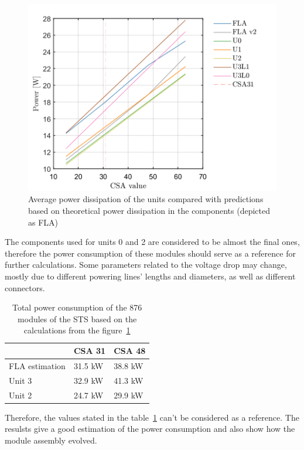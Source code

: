 \begin{figure}[h!]
\centering
\includegraphics[width=0.65\columnwidth]{Chapter6/DCS/images/theor.png}
\caption{Average power dissipation of the units compared with predictions based on theoretical power dissipation in the components (depicted as FLA)} 
\label{fig_theor}
\end{figure}
The components used for units 0 and 2 are considered to be almost the final ones, therefore the power consumption of these modules should serve as a reference for further calculations. Some parameters related to the voltage drop may change, mostly due to different powering lines' lengths and diameters, as well as different connectors. 
\begin{table}[h!]
\centering
\begin{tabular}{lll}
\hline
               & \gls{CSA} 31  & \gls{CSA} 48  \\ \hline
FLA estimation & 31.5 kW & 38.8 kW \\
Unit 3         & 32.9 kW & 41.3 kW \\
Unit 2         & 24.7 kW & 29.9 kW \\ \hline
\end{tabular}
\caption{Total power consumption of the 876 modules of the \gls{STS} based on the calculations from the figure~\ref{fig_theor}}
\label{tab:power_cons}
\end{table}
Therefore, the values stated in the table~\ref{tab:power_cons} can't be considered as a reference. The resulsts give a good estimation of the power consumption and also show how the module assembly evolved. 
